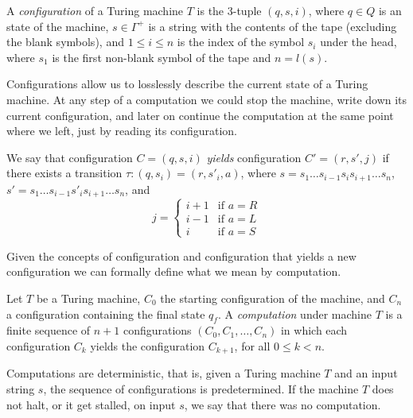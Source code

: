 \begin{definition}
A \emph{configuration} of a Turing machine $T$ is the 3-tuple $\left(q,s,i\right)$, where $q\in Q$ is an state of the machine, $s\in\Gamma^+$ is a string with the contents of the tape (excluding the blank symbols), and $1 \le i \le n$ is the index of the symbol $s_i$ under the head, where $s_1$ is the first non-blank symbol of the tape and $n=l(s)$. 
\end{definition}

Configurations allow us to losslessly describe the current state of a Turing machine. At any step of a computation we could stop the machine, write down its current configuration, and later on continue the computation at the same point where we left, just by reading its configuration.

\begin{definition}
We say that configuration $C=\left(q,s,i\right)$ \emph{yields} configuration $C'=\left(r,s',j\right)$ if there exists a transition $\tau:\left(q, s_{i}\right) = \left(r, s'_{i}, a\right)$, where $s=s_{1} \dots s_{i-1}s_{i}s_{i+1} \dots s_{n}$, $s'=s_{1} \dots s_{i-1}s'_{i}s_{i+1} \dots s_{n}$, and
\begin{equation}
  j = \begin{cases}
        i+1 & \text{if $a=R$} \\
        i-1 & \text{if $a=L$} \\
        i   & \text{if $a=S$}
  \end{cases}
\end{equation}
\end{definition}

Given the concepts of configuration and configuration that yields a new configuration we can formally define what we mean by computation.

\begin{definition}[Computation]
Let $T$ be a Turing machine, $C_{0}$ the starting configuration of the machine, and $C_n$ a configuration containing the final state $q_f$. A \emph{computation} under machine $T$ is a finite sequence of $n+1$ configurations $\left(C_{0},C_{1},\ldots,C_n\right)$ in which each configuration $C_{k}$ yields the configuration $C_{k+1}$, for all $0\leq k < n$.
\end{definition}

Computations are deterministic, that is, given a Turing machine $T$ and an input string $s$, the sequence of configurations is predetermined. If the machine $T$ does not halt, or it get stalled, on input $s$, we say that there was no computation.

